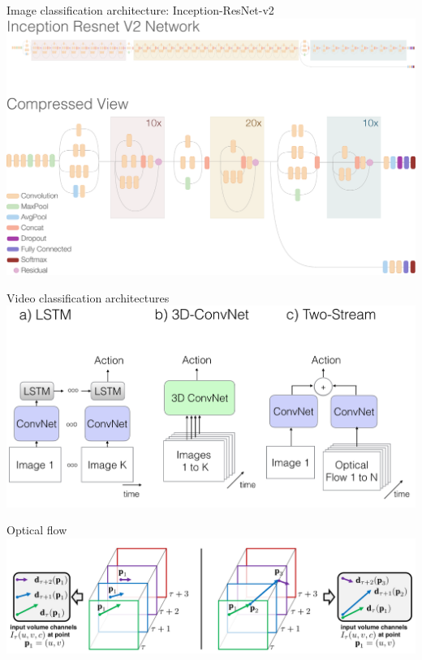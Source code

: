 \documentclass{beamer}
\begin{document}
{%
\begin{frame}{Image classification architecture: Inception-ResNet-v2}
        \includegraphics[scale=0.2]{data/inception-resnet-v2.png}
\end{frame}
}

{%
\begin{frame}{Video classification architectures}
        \includegraphics[scale=0.22]{data/lstm-3d-convnet-two-stream-cropped.png}
\end{frame}
}

{%
\begin{frame}{Optical flow}
        \includegraphics[scale=0.2]{data/optical-flow-vectors.png}
\end{frame}
}
\end{document}
